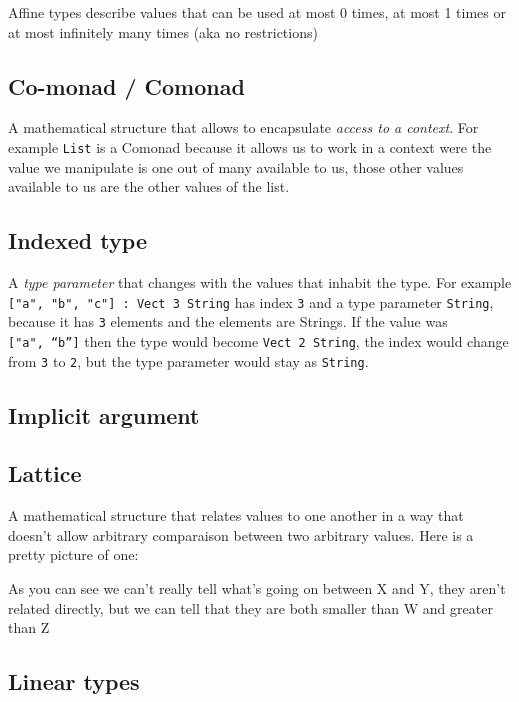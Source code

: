 \documentclass[
]{article}
\begin{document}
Affine types describe values that can be used at most 0 times, at most 1
times or at most infinitely many times (aka no restrictions)

\hypertarget{co-monad-comonad}{%
\subsection{Co-monad / Comonad}\label{co-monad-comonad}}

A mathematical structure that allows to encapsulate \emph{access to a
context}. For example \texttt{List} is a Comonad because it allows us to
work in a context were the value we manipulate is one out of many
available to us, those other values available to us are the other values
of the list.

\hypertarget{indexed-type}{%
\subsection{Indexed type}\label{indexed-type}}

A \emph{type parameter} that changes with the values that inhabit the
type. For example \texttt{{[}"a",\ "b",\ "c"{]}\ :\ Vect\ 3\ String} has
index \texttt{3} and a type parameter \texttt{String}, because it has
\texttt{3} elements and the elements are Strings. If the value was
\texttt{{[}\textasciigrave{}"a",\ “b”{]}} then the type would become
\texttt{Vect\ 2\ String}, the index would change from \texttt{3} to
\texttt{2}, but the type parameter would stay as \texttt{String}.

\hypertarget{implicit-argument}{%
\subsection{Implicit argument}\label{implicit-argument}}

\hypertarget{lattice}{%
\subsection{Lattice}\label{lattice}}

A mathematical structure that relates values to one another in a way
that doesn't allow arbitrary comparaison between two arbitrary values.
Here is a pretty picture of one:

As you can see we can't really tell what's going on between X and Y,
they aren't related directly, but we can tell that they are both smaller
than W and greater than Z

\hypertarget{linear-types-1}{%
\subsection{Linear types}\label{linear-types-1}}
\end{document}

